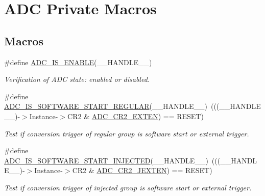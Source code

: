 \hypertarget{group___a_d_c___private___macros}{\section{A\-D\-C Private Macros}
\label{group___a_d_c___private___macros}
}
\subsection*{Macros}
\begin{DoxyCompactItemize}
\item 
\#define \hyperlink{group___a_d_c___private___macros_gafe3a7a04ff078c62ae98b19403f696c7}{A\-D\-C\-\_\-\-I\-S\-\_\-\-E\-N\-A\-B\-L\-E}(\-\_\-\-\_\-\-H\-A\-N\-D\-L\-E\-\_\-\-\_\-)
\begin{DoxyCompactList}\small\item\em Verification of A\-D\-C state\-: enabled or disabled. \end{DoxyCompactList}\item 
\#define \hyperlink{group___a_d_c___private___macros_ga2ccb82ecf85d6c6d1ff2cdf9b6a82d2b}{A\-D\-C\-\_\-\-I\-S\-\_\-\-S\-O\-F\-T\-W\-A\-R\-E\-\_\-\-S\-T\-A\-R\-T\-\_\-\-R\-E\-G\-U\-L\-A\-R}(\-\_\-\-\_\-\-H\-A\-N\-D\-L\-E\-\_\-\-\_\-)~(((\-\_\-\-\_\-\-H\-A\-N\-D\-L\-E\-\_\-\-\_\-)-\/$>$Instance-\/$>$C\-R2 \& \hyperlink{group___peripheral___registers___bits___definition_ga574b4d8e90655d0432882d620e629234}{A\-D\-C\-\_\-\-C\-R2\-\_\-\-E\-X\-T\-E\-N}) == R\-E\-S\-E\-T)
\begin{DoxyCompactList}\small\item\em Test if conversion trigger of regular group is software start or external trigger. \end{DoxyCompactList}\item 
\#define \hyperlink{group___a_d_c___private___macros_gaa3a1c2197a097b9bb8159b6eb1ac8941}{A\-D\-C\-\_\-\-I\-S\-\_\-\-S\-O\-F\-T\-W\-A\-R\-E\-\_\-\-S\-T\-A\-R\-T\-\_\-\-I\-N\-J\-E\-C\-T\-E\-D}(\-\_\-\-\_\-\-H\-A\-N\-D\-L\-E\-\_\-\-\_\-)~(((\-\_\-\-\_\-\-H\-A\-N\-D\-L\-E\-\_\-\-\_\-)-\/$>$Instance-\/$>$C\-R2 \& \hyperlink{group___peripheral___registers___bits___definition_ga07330f702208792faca3a563dc4fd9c6}{A\-D\-C\-\_\-\-C\-R2\-\_\-\-J\-E\-X\-T\-E\-N}) == R\-E\-S\-E\-T)
\begin{DoxyCompactList}\small\item\em Test if conversion trigger of injected group is software start or external trigger. \end{DoxyCompactList}\item 

\end{DoxyCompactItemize}
